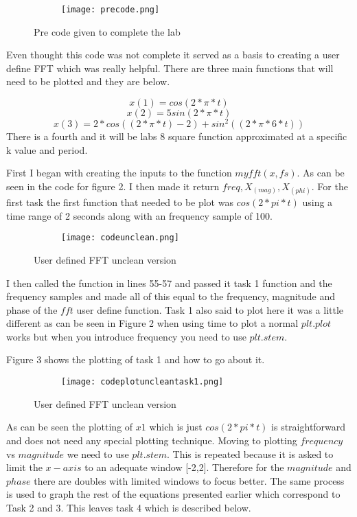 \documentclass[12pt,a4paper]{article}
\begin{document}
 
\begin{figure}[h]
\begin{subfigure}{ 1\textwidth}
\texttt{[image: precode.png]}
\end{subfigure}
\caption{Pre code given to complete the lab}
\label{fig:image2}
\end{figure}
Even thought this code was not complete it served as a basis to creating a user define FFT which was really helpful. There are three main functions that will need to be plotted and they are below.

\[x(1)=cos(2*\pi*t)\]
\[x(2)=5sin(2*\pi*t)\]
\[x(3)=2*cos((2*\pi*t)-2)+sin^2((2*\pi*6*t))\]
There is a fourth and it will be labs 8 square function approximated at a specific k value and period.


\clearpage
First I began with creating the inputs to the function $myfft(x,fs)$. As can be seen in the code for figure 2. I then made it return $freq, X_(mag),X_(phi)$. For the first task the first function that needed to be plot was $cos(2*pi*t)$ using a time range of 2 seconds along with an frequency sample of 100. 
\begin{figure}[h]
\begin{subfigure}{ 1\textwidth}
\texttt{[image: codeunclean.png]}
\end{subfigure}
\caption{User defined FFT unclean version}
\label{fig:image2}
\end{figure}
I then called the function in lines 55-57 and passed it task 1 function and the frequency samples and made all of this equal to the frequency, magnitude and phase of the $fft$ user define function. Task 1 also said to plot here it was a little different as can be seen in Figure 2 when using time to plot a normal $plt.plot $ works but when you introduce frequency you need to use $plt.stem$.


\clearpage
Figure 3 shows the plotting of task 1 and how to go about it.
\begin{figure}[h]
\begin{subfigure}{ 1\textwidth}
\texttt{[image: codeplotuncleantask1.png]}
\end{subfigure}
\caption{User defined FFT unclean version}
\label{fig:image2}
\end{figure}

As can be seen the plotting of $x1$ which is just $cos(2*pi*t)$ is straightforward and does not need any special plotting technique. Moving to plotting $frequency$ vs $magnitude $ we need to use $plt.stem$. This is repeated because it is asked to limit the $x-axis $ to an adequate window [-2,2]. Therefore for the $magnitude $ and $phase$ there are doubles with limited windows to focus better. The same process is used to graph the rest of the equations presented earlier which correspond to Task 2 and 3. This leaves task 4 which is described below.
\clearpage
\end{document}
